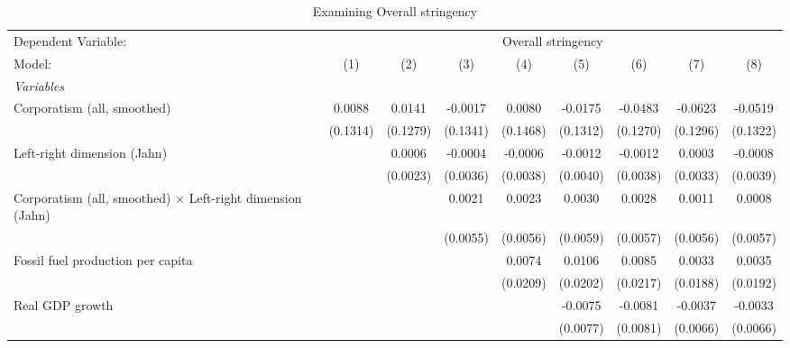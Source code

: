 
\begin{table}[htbp]
   \caption{Examining Overall stringency}
   \centering
   \begin{tabular}{lcccccccc}
      \tabularnewline \midrule \midrule
      Dependent Variable: & \multicolumn{8}{c}{Overall stringency}\\
      Model:                                                            & (1)                   & (2)      & (3)      & (4)      & (5)      & (6)      & (7)      & (8)\\  
      \midrule
      \emph{Variables}\\
      Corporatism (all, smoothed)                                       & 0.0088                & 0.0141   & -0.0017  & 0.0080   & -0.0175  & -0.0483  & -0.0623  & -0.0519\\   
                                                                        & (0.1314)              & (0.1279) & (0.1341) & (0.1468) & (0.1312) & (0.1270) & (0.1296) & (0.1322)\\   
      Left-right dimension (Jahn)                                       &                       & 0.0006   & -0.0004  & -0.0006  & -0.0012  & -0.0012  & 0.0003   & -0.0008\\   
                                                                        &                       & (0.0023) & (0.0036) & (0.0038) & (0.0040) & (0.0038) & (0.0033) & (0.0039)\\   
      Corporatism (all, smoothed) $\times$ Left-right dimension (Jahn)  &                       &          & 0.0021   & 0.0023   & 0.0030   & 0.0028   & 0.0011   & 0.0008\\   
                                                                        &                       &          & (0.0055) & (0.0056) & (0.0059) & (0.0057) & (0.0056) & (0.0057)\\   
      Fossil fuel production per capita                                 &                       &          &          & 0.0074   & 0.0106   & 0.0085   & 0.0033   & 0.0035\\   
                                                                        &                       &          &          & (0.0209) & (0.0202) & (0.0217) & (0.0188) & (0.0192)\\   
      Real GDP growth                                                   &                       &          &          &          & -0.0075  & -0.0081  & -0.0037  & -0.0033\\   
                                                                        &                       &          &          &          & (0.0077) & (0.0081) & (0.0066) & (0.0066)\\   

\end{tabular}
\end{table}
